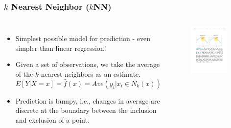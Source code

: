 \documentclass[aspectratio=169]{beamer}
\begin{document}
\begin{frame}
\frametitle{$k$ Nearest Neighbor ($k$NN)}
\begin{columns}
    \begin{itemize}
        \item Simplest possible model for prediction - even simpler than linear regression!
        \item Given a set of observations, we take the average of the $k$ nearest neighbors as an estimate.
        \begin{equation*}
            E[Y|X=x] = \hat{f}(x) = Ave(y_i|x_i \in N_k(x))
        \end{equation*}
        \item Prediction is bumpy, i.e., changes in average are discrete at the boundary between the inclusion and exclusion of a point.
    \end{itemize}
\begin{figure}
            \centering
            \includegraphics[width=0.9\textwidth]{figures/knn.pdf}
        \end{figure}
\end{columns}
\end{frame}
\end{document}
